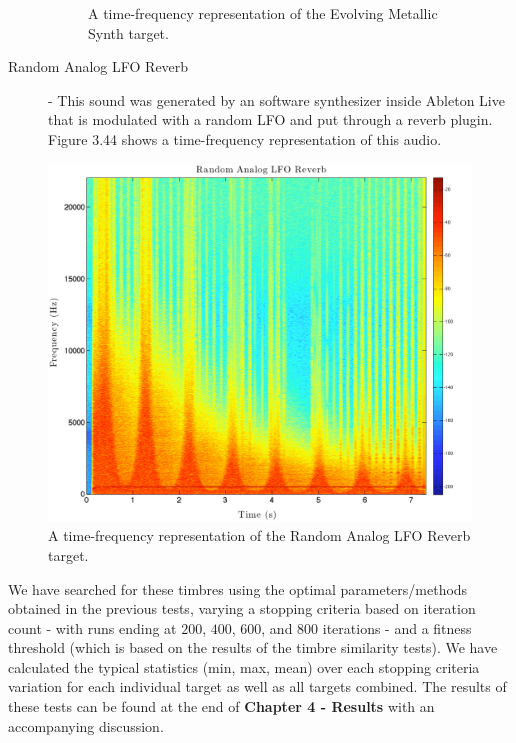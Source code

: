 \documentclass[a4paper,12pt]{report} 	%
\numberwithin{figure}{chapter}
\numberwithin{table}{chapter}
\numberwithin{equation}{chapter}
\begin{document}
\begin{flushleft}
\begin{description}
\begin{figure}[h!]
\begin{center}
\caption[Evolving Metallic Synth Time-Frequency Representation]{A time-frequency representation of the Evolving Metallic Synth target.}
\end{center}
\end{figure}
\item[Random Analog LFO Reverb] - This sound was generated by an software synthesizer inside Ableton Live that is modulated with a random LFO and put through a reverb plugin. Figure 3.44 shows a time-frequency representation of this audio.
\end{description}
\begin{figure}[h!]
\begin{center}
\includegraphics[scale=0.35,width=\linewidth]{RandomAnalogLFOReverb}
\caption[Random Analog LFO Reverb Time-Frequency Representation]{A time-frequency representation of the Random Analog LFO Reverb target.}
\end{center}
\end{figure}
We have searched for these timbres using the optimal parameters/methods obtained in the previous tests, varying a stopping criteria based on iteration count - with runs ending at $200$, $400$, $600$, and $800$ iterations - and a fitness threshold (which is based on the results of the timbre similarity tests). We have calculated the typical statistics (min, max, mean) over each stopping criteria variation for each individual target as well as all targets combined. The results of these tests can be found at the end of \textbf{Chapter 4 - Results} with an accompanying discussion.


\end{flushleft}
\end{document}
